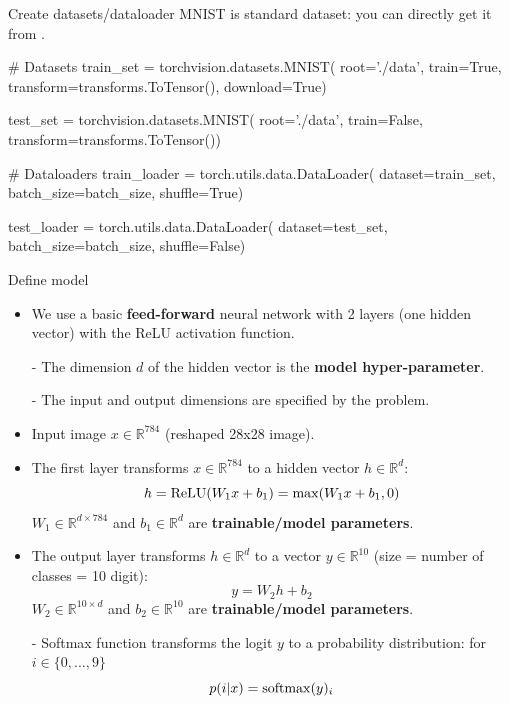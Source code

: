 \begin{frame}[fragile]{Create datasets/dataloader}
MNIST is standard dataset: you can directly get it from .
\begin{python}
# Datasets
train_set = torchvision.datasets.MNIST(
    root='./data', train=True, transform=transforms.ToTensor(), 
    download=True)

test_set = torchvision.datasets.MNIST(
    root='./data', train=False, transform=transforms.ToTensor())

# Dataloaders
train_loader = torch.utils.data.DataLoader(
    dataset=train_set, batch_size=batch_size, shuffle=True)

test_loader = torch.utils.data.DataLoader(
    dataset=test_set, batch_size=batch_size, shuffle=False)

\end{python}
\end{frame}

\begin{frame}[fragile]{Define model}
\begin{itemize}
\item We use a basic \textbf{feed-forward} neural network with 2 layers (one hidden vector) with the ReLU activation function.
\item[-] The dimension $d$ of the hidden vector is the \textbf{model hyper-parameter}.
\item[-] The input and output dimensions are specified by the problem.
\vsp
\pause
\item Input image $x \in \mathbb{R}^{784}$ (reshaped 28x28 image).
\item The first layer transforms $x \in \mathbb{R}^{784}$ to a hidden vector $h \in \mathbb{R}^{d}$:
\[
h = \operatorname{ReLU}(W_1x + b_1) = \max(W_1x + b_1, 0)
\]
$W_1 \in \mathbb{R}^{d \times 784}$ and $b_1 \in \mathbb{R}^{d}$ are \textbf{trainable/model parameters}.
\pause
\item The output layer transforms $h \in \mathbb{R}^{d}$ to a vector $y \in \mathbb{R}^{10}$
(size = number of classes = 10 digit):
\[
y = W_2h + b_2
\]
$W_2 \in \mathbb{R}^{10 \times d}$ and $b_2 \in \mathbb{R}^{10}$ are \textbf{trainable/model parameters}.
\pause
\item[-] Softmax function transforms the logit $y$ to a probability distribution: for $i \in \{0,..., 9\}$
\[
p(i|x) = \operatorname{softmax}(y)_i
\]
\end{itemize}
\end{frame}

